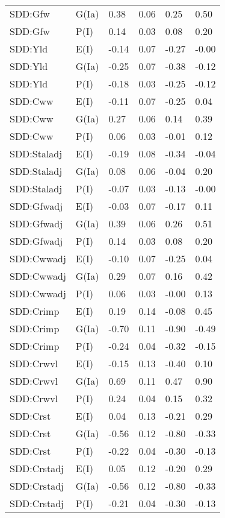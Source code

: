 \begin{center}
\begin{longtable}{|p{1.1in}|p{0.7in}|p{0.7in}|p{0.6in}|p{0.6in}|p{0.6in}|}
  SDD:Gfw & G(Ia) & 0.38 & 0.06 & 0.25 & 0.50 \\ 
  SDD:Gfw & P(I) & 0.14 & 0.03 & 0.08 & 0.20 \\ 
  SDD:Yld & E(I) & -0.14 & 0.07 & -0.27 & -0.00 \\ 
  SDD:Yld & G(Ia) & -0.25 & 0.07 & -0.38 & -0.12 \\ 
  SDD:Yld & P(I) & -0.18 & 0.03 & -0.25 & -0.12 \\ 
  SDD:Cww & E(I) & -0.11 & 0.07 & -0.25 & 0.04 \\ 
  SDD:Cww & G(Ia) & 0.27 & 0.06 & 0.14 & 0.39 \\ 
  SDD:Cww & P(I) & 0.06 & 0.03 & -0.01 & 0.12 \\ 
  SDD:Staladj & E(I) & -0.19 & 0.08 & -0.34 & -0.04 \\ 
  SDD:Staladj & G(Ia) & 0.08 & 0.06 & -0.04 & 0.20 \\ 
  SDD:Staladj & P(I) & -0.07 & 0.03 & -0.13 & -0.00 \\ 
  SDD:Gfwadj & E(I) & -0.03 & 0.07 & -0.17 & 0.11 \\ 
  SDD:Gfwadj & G(Ia) & 0.39 & 0.06 & 0.26 & 0.51 \\ 
  SDD:Gfwadj & P(I) & 0.14 & 0.03 & 0.08 & 0.20 \\ 
  SDD:Cwwadj & E(I) & -0.10 & 0.07 & -0.25 & 0.04 \\ 
  SDD:Cwwadj & G(Ia) & 0.29 & 0.07 & 0.16 & 0.42 \\ 
  SDD:Cwwadj & P(I) & 0.06 & 0.03 & -0.00 & 0.13 \\ 
  SDD:Crimp & E(I) & 0.19 & 0.14 & -0.08 & 0.45 \\ 
  SDD:Crimp & G(Ia) & -0.70 & 0.11 & -0.90 & -0.49 \\ 
  SDD:Crimp & P(I) & -0.24 & 0.04 & -0.32 & -0.15 \\ 
  SDD:Crwvl & E(I) & -0.15 & 0.13 & -0.40 & 0.10 \\ 
  SDD:Crwvl & G(Ia) & 0.69 & 0.11 & 0.47 & 0.90 \\ 
  SDD:Crwvl & P(I) & 0.24 & 0.04 & 0.15 & 0.32 \\ 
  SDD:Crst & E(I) & 0.04 & 0.13 & -0.21 & 0.29 \\ 
  SDD:Crst & G(Ia) & -0.56 & 0.12 & -0.80 & -0.33 \\ 
  SDD:Crst & P(I) & -0.22 & 0.04 & -0.30 & -0.13 \\ 
  SDD:Crstadj & E(I) & 0.05 & 0.12 & -0.20 & 0.29 \\ 
  SDD:Crstadj & G(Ia) & -0.56 & 0.12 & -0.80 & -0.33 \\ 
  SDD:Crstadj & P(I) & -0.21 & 0.04 & -0.30 & -0.13 \\ 

\end{longtable}
\end{center}
